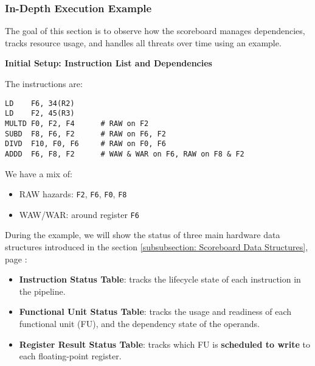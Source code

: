 \subsubsection{In-Depth Execution Example}

The goal of this section is to observe how the scoreboard manages dependencies, tracks resource usage, and handles all threats over time using an example.

\highspace
\begin{flushleft}
    \textcolor{Green3}{ \textbf{Initial Setup: Instruction List and Dependencies}}
\end{flushleft}
The instructions are:
\begin{lstlisting}[language=riscv]
LD    F6, 34(R2)
LD    F2, 45(R3)
MULTD F0, F2, F4      # RAW on F2
SUBD  F8, F6, F2      # RAW on F6, F2
DIVD  F10, F0, F6     # RAW on F0, F6
ADDD  F6, F8, F2      # WAW & WAR on F6, RAW on F8 & F2
\end{lstlisting}
We have a mix of:
\begin{itemize}
    \item RAW hazards: \texttt{F2}, \texttt{F6}, \texttt{F0}, \texttt{F8}
    \item WAW/WAR: around register \texttt{F6}
\end{itemize}
During the example, we will show the status of three main hardware data structures introduced in the section \ref{subsubsection: Scoreboard Data Structures}, page \pageref{subsubsection: Scoreboard Data Structures}:
\begin{itemize}
    \item \textbf{Instruction Status Table}: tracks the lifecycle state of each instruction in the pipeline.
    \item \textbf{Functional Unit Status Table}: tracks the usage and readiness of each functional unit (FU), and the dependency state of the operands.
    \item \textbf{Register Result Status Table}: tracks which FU is \textbf{scheduled to write} to each floating-point register.
\end{itemize}


\newpage


